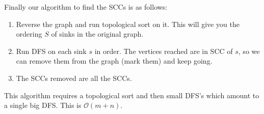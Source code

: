 Finally our algorithm to find the SCCs is as follows:

\begin{algothm}
    \begin{enumerate}
        \item Reverse the graph and run topological sort on it. This will give you the ordering $S$ of sinks in the original graph.
        \item Run DFS on each sink $s$ in order. The vertices reached are in SCC of $s$, so we can remove them from the graph (mark them) and keep going.
        \item The SCCs removed are all the SCCs.
    \end{enumerate}

    This algorithm requires a topological sort and then small DFS's which amount to a single big DFS. This is
    $\mathcal{O}(m + n)$.
\end{algothm}